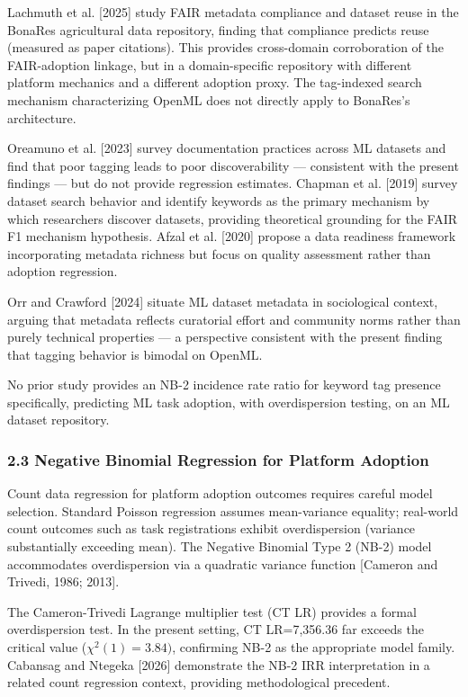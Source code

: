 Lachmuth et al. [2025] study FAIR metadata compliance and dataset reuse in the BonaRes agricultural data repository, finding that compliance predicts reuse (measured as paper citations). This provides cross-domain corroboration of the FAIR-adoption linkage, but in a domain-specific repository with different platform mechanics and a different adoption proxy. The tag-indexed search mechanism characterizing OpenML does not directly apply to BonaRes's architecture.

Oreamuno et al. [2023] survey documentation practices across ML datasets and find that poor tagging leads to poor discoverability --- consistent with the present findings --- but do not provide regression estimates. Chapman et al. [2019] survey dataset search behavior and identify keywords as the primary mechanism by which researchers discover datasets, providing theoretical grounding for the FAIR F1 mechanism hypothesis. Afzal et al. [2020] propose a data readiness framework incorporating metadata richness but focus on quality assessment rather than adoption regression.

Orr and Crawford [2024] situate ML dataset metadata in sociological context, arguing that metadata reflects curatorial effort and community norms rather than purely technical properties --- a perspective consistent with the present finding that tagging behavior is bimodal on OpenML.

No prior study provides an NB-2 incidence rate ratio for keyword tag presence specifically, predicting ML task adoption, with overdispersion testing, on an ML dataset repository.

\subsubsection{2.3 Negative Binomial Regression for Platform Adoption}

Count data regression for platform adoption outcomes requires careful model selection. Standard Poisson regression assumes mean-variance equality; real-world count outcomes such as task registrations exhibit overdispersion (variance substantially exceeding mean). The Negative Binomial Type 2 (NB-2) model accommodates overdispersion via a quadratic variance function [Cameron and Trivedi, 1986; 2013].

The Cameron-Trivedi Lagrange multiplier test (CT LR) provides a formal overdispersion test. In the present setting, CT LR=7,356.36 far exceeds the critical value ($\chi^{2}(1)=3.84)$, confirming NB-2 as the appropriate model family. Cabansag and Ntegeka [2026] demonstrate the NB-2 IRR interpretation in a related count regression context, providing methodological precedent.

